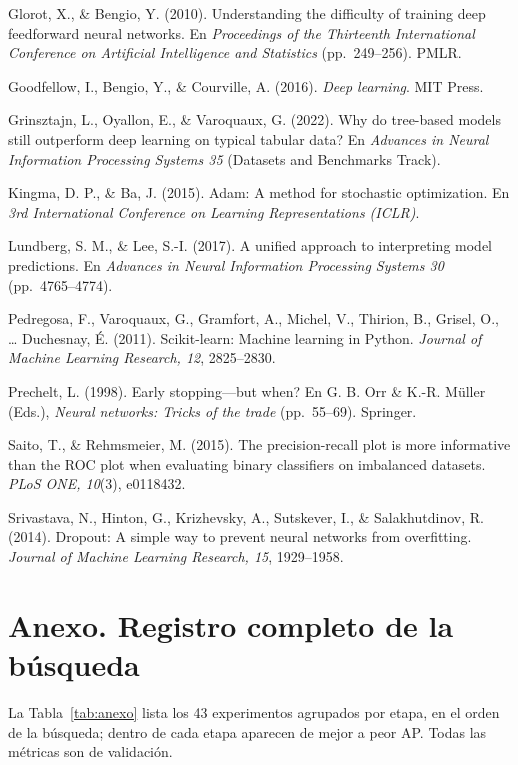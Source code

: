 \documentclass[12pt,a4paper]{article}
\begin{document}
Glorot, X., \& Bengio, Y. (2010). Understanding the difficulty of training deep feedforward neural networks. En \textit{Proceedings of the Thirteenth International Conference on Artificial Intelligence and Statistics} (pp.~249--256). PMLR.

Goodfellow, I., Bengio, Y., \& Courville, A. (2016). \textit{Deep learning}. MIT Press.

Grinsztajn, L., Oyallon, E., \& Varoquaux, G. (2022). Why do tree-based models still outperform deep learning on typical tabular data? En \textit{Advances in Neural Information Processing Systems 35} (Datasets and Benchmarks Track).

Kingma, D. P., \& Ba, J. (2015). Adam: A method for stochastic optimization. En \textit{3rd International Conference on Learning Representations (ICLR)}.

Lundberg, S. M., \& Lee, S.-I. (2017). A unified approach to interpreting model predictions. En \textit{Advances in Neural Information Processing Systems 30} (pp.~4765--4774).

Pedregosa, F., Varoquaux, G., Gramfort, A., Michel, V., Thirion, B., Grisel, O., \ldots{} Duchesnay, É. (2011). Scikit-learn: Machine learning in Python. \textit{Journal of Machine Learning Research, 12}, 2825--2830.

Prechelt, L. (1998). Early stopping---but when? En G. B. Orr \& K.-R. Müller (Eds.), \textit{Neural networks: Tricks of the trade} (pp.~55--69). Springer.

Saito, T., \& Rehmsmeier, M. (2015). The precision-recall plot is more informative than the ROC plot when evaluating binary classifiers on imbalanced datasets. \textit{PLoS ONE, 10}(3), e0118432.

Srivastava, N., Hinton, G., Krizhevsky, A., Sutskever, I., \& Salakhutdinov, R. (2014). Dropout: A simple way to prevent neural networks from overfitting. \textit{Journal of Machine Learning Research, 15}, 1929--1958.

\endgroup

\newpage
\appendix
\section*{Anexo. Registro completo de la búsqueda}

\noindent La Tabla~\ref{tab:anexo} lista los 43 experimentos agrupados por etapa, en el orden de la búsqueda; dentro de cada etapa aparecen de mejor a peor AP. Todas las métricas son de validación.
\end{document}
